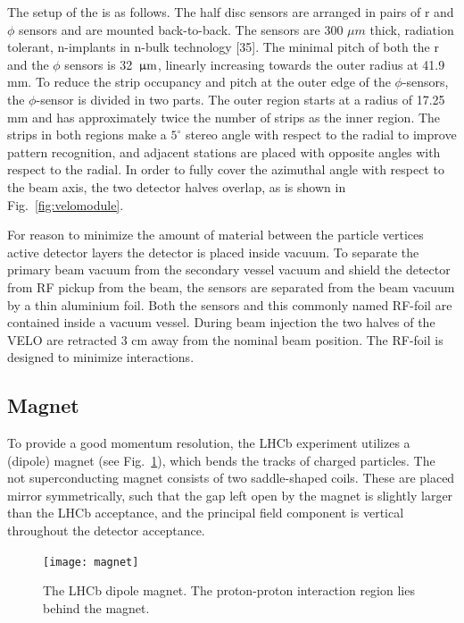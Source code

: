 The setup of the \velo is as follows. The half disc sensors are arranged in pairs of
r and $\phi$ sensors and are mounted back-to-back. The sensors are 300 $\mu m$
thick, radiation tolerant, n-implants in n-bulk technology [35]. The minimal
pitch of both the r and the $\phi$ sensors is 32 $\,\upmu\rm m$, linearly increasing
towards the outer radius at 41.9 mm. To reduce the strip occupancy and pitch at
the outer edge of the $\phi$-sensors, the $\phi$-sensor is divided in two parts.
The outer region starts at a radius of 17.25 mm and has approximately twice the
number of strips as the inner region. The strips in both regions make 
a $5^\circ$ stereo angle with respect to the radial to improve pattern 
recognition, and adjacent stations are placed with opposite angles with respect
to the radial. In order to fully cover the azimuthal angle with respect to the 
beam axis, the two detector halves overlap, as is shown in
Fig.~\ref{fig:velomodule}. 

For reason to minimize the amount of material between the particle vertices active detector
layers the detector is placed inside vacuum. To separate the primary beam vacuum
from the secondary vessel vacuum and shield the detector from RF pickup from the
beam, the sensors are separated from the beam vacuum by a thin aluminium foil.
Both the sensors and this commonly named RF-foil are contained inside a vacuum vessel.
During beam injection the two halves of the VELO are retracted 3 cm away from
the nominal beam position. The RF-foil is designed to minimize interactions.

\subsection{Magnet}

To provide a good momentum resolution, the LHCb experiment
utilizes a (dipole) magnet (see Fig.~\ref{fig:magnet}), which bends the tracks of charged particles.
The not superconducting magnet consists of two saddle-shaped coils.
These are placed mirror symmetrically, such that the gap left open by the magnet
is slightly larger than the LHCb acceptance, and the principal field component is 
vertical throughout the detector acceptance.

\begin{figure}[tb]
\begin{center}
\texttt{[image: magnet]}
\end{center}
\caption{\small The LHCb dipole magnet. The proton-proton interaction
region lies behind the magnet.}
\label{fig:magnet}
\end{figure}


